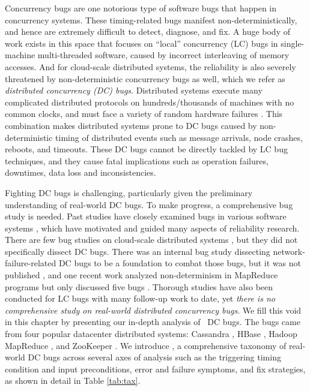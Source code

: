 
Concurrency bugs are one notorious type of software bugs that happen in
concurrency systems. These timing-related bugs manifest non-deterministically,
and hence are extremely difficult to detect, diagnose, and fix. A huge body of
work exists in this space that focuses on ``local'' concurrency (LC) bugs in
single-machine multi-threaded software, caused by incorrect interleaving of
memory accesses. And for cloud-scale distributed systems, the reliability is
also severely threatened by non-deterministic concurrency bugs as well, which we
refer as {\em distributed concurrency (DC) bugs}. Distributed systems execute
many complicated distributed protocols on hundreds/thousands of machines with no
common clocks, and must face a variety of random hardware failures
\cite{Do+13-Limplock, Gunawi+14-Cbs}. This combination makes distributed
systems prone to DC bugs caused by non-deterministic timing of distributed
events such as message arrivals, node crashes, reboots, and timeouts. These DC
bugs cannot be directly tackled by LC bug techniques, and they cause fatal
implications such as operation failures, downtimes, data loss and
inconsistencies.

Fighting DC bugs is challenging, particularly given the preliminary
understanding of real-world DC bugs.  To make progress, a comprehensive bug
study is needed. Past studies have closely examined bugs in various software
systems \cite{Chou+01-Empirical, Lu+13-FsEvolution, linux.asplos11}, which have
motivated and guided many aspects of reliability research.
%
There are few bug studies on cloud-scale distributed systems
\cite{Gunawi+14-Cbs, Li+13-ScopeBugStudy}, but they did not specifically dissect
DC bugs. There was an internal bug study dissecting network-failure-related DC
bugs to be a foundation to combat those bugs, but it was not published
\cite{Joshi+13-SetsudoTesting}, and one recent work analyzed non-determinism in
MapReduce programs but only discussed five bugs \cite{Xiao+14-NonDetMR}.
%
Thorough studies have also been conducted for LC bugs \cite{study.dsn10,
Lu+08-ConcurrencyBugStudy} with many follow-up work to date, yet {\em there is
no comprehensive study on real-world distributed concurrency bugs}. We fill this
void in this chapter by presenting our in-depth analysis of \numDcBugs\ DC bugs.
The bugs came from four popular datacenter distributed systems: Cassandra
\cite{CassandraWeb}, HBase \cite{HBaseWeb}, Hadoop MapReduce \cite{HadoopWeb},
and ZooKeeper \cite{ZooKeeperWeb}.
%
We introduce \taxdc, a comprehensive taxonomy of real-world DC bugs across
several axes of analysis such as the triggering timing condition and input
preconditions, error and failure symptoms, and fix strategies, as shown in
detail in Table \ref{tab:tax}.

